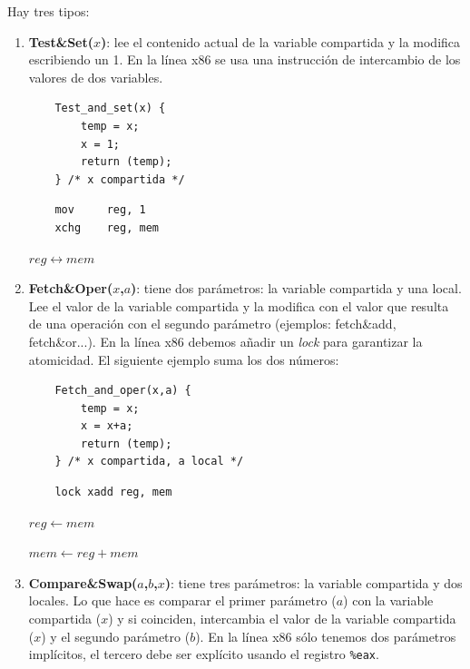 \documentclass[10pt,a4paper,spanish]{report}
\begin{document}
Hay tres tipos:

\begin{enumerate}[\color{azul}{\bf $\heartsuit$}]
    \item \textcolor{azul}{\textbf{Test\&Set($x$)}}: lee el contenido actual de la variable compartida y la modifica escribiendo un 1. En la línea x86 se usa una instrucción de intercambio de los valores de dos variables.

    \begin{minipage}{0.5\textwidth}
    \begin{verbatim}
    Test_and_set(x) {
        temp = x;
        x = 1;
        return (temp);
    } /* x compartida */
    \end{verbatim}
    \end{minipage}
    \begin{minipage}{0.5\textwidth}
    \begin{verbatim}
    mov     reg, 1
    xchg    reg, mem
    \end{verbatim}

    $reg \longleftrightarrow mem$
    \end{minipage}

    \item \textcolor{azul}{\textbf{Fetch\&Oper($x$,$a$)}}: tiene dos parámetros: la variable compartida y una local. Lee el valor de la variable compartida y la modifica con el valor que resulta de una operación con el segundo parámetro (ejemplos: fetch\&add, fetch\&or...). En la línea x86 debemos añadir un \textit{\textcolor{azul}{lock}} para garantizar la atomicidad. El siguiente ejemplo suma los dos números:

    \begin{minipage}{0.5\textwidth}
    \begin{verbatim}
    Fetch_and_oper(x,a) {
        temp = x;
        x = x+a;
        return (temp);
    } /* x compartida, a local */
    \end{verbatim}
    \end{minipage}
    \begin{minipage}{0.5\textwidth}
    \begin{verbatim}
    lock xadd reg, mem
    \end{verbatim}

    $reg \longleftarrow mem$

    $mem  \longleftarrow reg+mem$
    \end{minipage}

    \item \textcolor{azul}{\textbf{Compare\&Swap($a$,$b$,$x$)}}: tiene tres parámetros: la variable compartida y dos locales. Lo que hace es comparar el primer parámetro ($a$) con la variable compartida ($x$) y si coinciden, intercambia el valor de la variable compartida ($x$) y el segundo parámetro ($b$). En la línea x86 sólo tenemos dos parámetros implícitos, el tercero debe ser explícito usando el registro \verb*|%eax|.


\end{enumerate}
\end{document}
